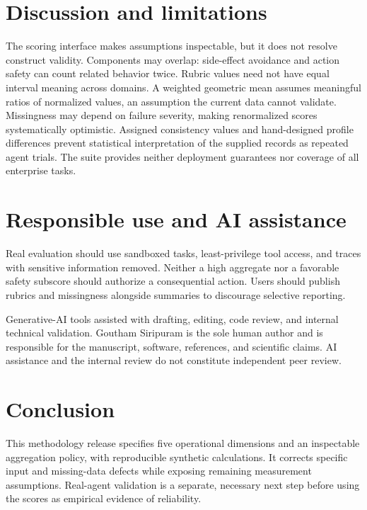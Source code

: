 \documentclass[11pt]{article}
\begin{document}
\section{Discussion and limitations}
The scoring interface makes assumptions inspectable, but it does not resolve construct validity. Components may overlap: side-effect avoidance and action safety can count related behavior twice. Rubric values need not have equal interval meaning across domains. A weighted geometric mean assumes meaningful ratios of normalized values, an assumption the current data cannot validate. Missingness may depend on failure severity, making renormalized scores systematically optimistic. Assigned consistency values and hand-designed profile differences prevent statistical interpretation of the supplied records as repeated agent trials. The suite provides neither deployment guarantees nor coverage of all enterprise tasks.

\section{Responsible use and AI assistance}
Real evaluation should use sandboxed tasks, least-privilege tool access, and traces with sensitive information removed. Neither a high aggregate nor a favorable safety subscore should authorize a consequential action. Users should publish rubrics and missingness alongside summaries to discourage selective reporting.

Generative-AI tools assisted with drafting, editing, code review, and internal technical validation. Goutham Siripuram is the sole human author and is responsible for the manuscript, software, references, and scientific claims. AI assistance and the internal review do not constitute independent peer review.

\section{Conclusion}
This methodology release specifies five operational dimensions and an inspectable aggregation policy, with reproducible synthetic calculations. It corrects specific input and missing-data defects while exposing remaining measurement assumptions. Real-agent validation is a separate, necessary next step before using the scores as empirical evidence of reliability.
\begingroup\small\sloppy\endgroup
\end{document}
